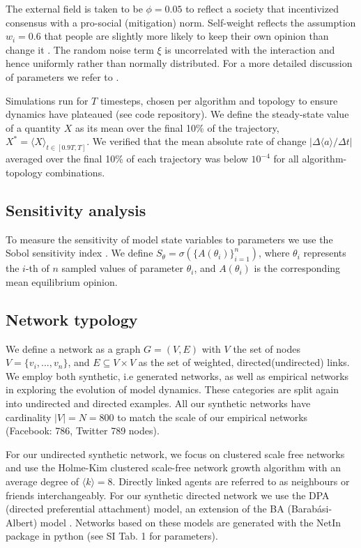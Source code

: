 \documentclass[unnumsec,webpdf,contemporary,large]{oup-authoring-template}%
\theoremstyle{thmstyleone}%
\theoremstyle{thmstyletwo}%
\theoremstyle{thmstylethree}%
\begin{document}
The external field is taken to be \(\phi = 0.05\) to reflect a society that incentivized consensus with a pro-social (mitigation) norm. Self-weight reflects the assumption \(w_i = 0.6\) that people are slightly more likely to keep their own opinion than change it \citep{mallinson_effects_2018}. The random noise term \(\xi\) is uncorrelated with the interaction and hence uniformly rather than normally distributed. For a more detailed discussion of parameters we refer to \citep{andersson_dynamics_2021}.

Simulations run for $T$ timesteps, chosen per algorithm and topology to ensure dynamics have plateaued (see code repository). We define the steady-state value of a quantity $X$ as its mean over the final 10\% of the trajectory, $X^* = \langle X \rangle_{t \in [0.9T, T]}$. We verified that the mean absolute rate of change $|\Delta \langle a \rangle / \Delta t|$ averaged over the final 10\% of each trajectory was below $10^{-4}$ for all algorithm-topology combinations.


\subsection{Sensitivity analysis}\label{sec:sensitivity}

To measure the sensitivity of model state variables to parameters we use the Sobol sensitivity index \cite{sobol_global_2001}. We define $S_{\theta} = \sigma(\{A(\theta_i)\}_{i=1}^n)$, where $\theta_i$ represents the $i$-th of $n$ sampled values of parameter $\theta_i$, and $A(\theta_i)$ is the corresponding mean equilibrium opinion.

\subsection{Network typology}\label{sec:network}

We define a network as a graph $G = (V, E)$ with $V$ the set of nodes $V = \{ v_i, ..., v_n \}$, and $E \subseteq V \times V$ as the set of weighted, directed(undirected) links. We employ both synthetic, i.e generated networks, as well as empirical networks in exploring the evolution of model dynamics. These categories are split again into undirected and directed examples. All our synthetic networks have cardinality $\vert V \vert = N = 800$ to match the scale of our empirical networks (Facebook: 786, Twitter 789 nodes).

For our undirected synthetic network, we focus on clustered scale free networks and use the Holme-Kim clustered scale-free network growth algorithm \citep{holme_growing_2002} with an average degree of \(\langle k \rangle = 8\). Directly linked agents are referred to as neighbours or friends interchangeably. For our synthetic directed network we use the DPA (directed preferential attachment) model, an extension of the BA (Barabási-Albert) model \citep{espin-noboa_inequality_2022}. Networks based on these models are generated with the NetIn package in python \citep{pynetin}(see SI Tab. 1 for parameters).
\end{document}
